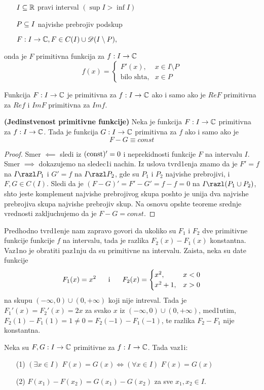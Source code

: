 \documentclass[../main_og.tex]{subfiles}
\begin{document}
\begin{itemize}
        \item[\cdot] $I\subseteq \mathbb{R}$ pravi interval $(\sup I > \inf I)$
        \item[\cdot] $P\subseteq I$ najvishe prebrojiv podskup
        \item[\cdot] $F:I\to \mathbb{C} , F\in C(I) \cup \mathscr{D}(I\setminus P),$
\end{itemize}
onda je $F$ primitivna funkcija za $f:I\to \mathbb{C}$
$$f(x)=\begin{cases}
			F'(x), & x\in I\setminus P\\
            \textrm{bilo shta}, & x\in P
		 \end{cases}$$
\begin{tvr}
Funkcija $F:I\to \mathbb{C}$ je primitivna za $f:I \to \mathbb{C}$ ako i samo ako je $Re F$ primitivna za $Re f$ i $Im F$ primitivna za $Im f$.
\end{tvr}
\begin{tvr}
\textbf{(Jedinstvenost primitivne funkcije)} Neka je funkcija $F:I \to \mathbb{C}$ primitivna za $f:I \to \mathbb{C}$. Tada je funkcija $G: I\to \mathbb{C}$ primitivna za $f$ ako i samo ako je 
$$F-G\equiv const$$
\end{tvr}
\begin{proof}
Smer $\impliedby$ sledi iz $(\textrm{\latin{const}})'=0$ i neprekidnosti funkcije $F$ na intervalu $I$. Smer $\implies$ dokazujemo na sledec1i nachin. Iz uslova tvrd1enja znamo da je $F'=f$ na $I\razl P_1$ i $G'=f$ na $I\razl P_2$, gde su $P_1$ i $P_2$ najvishe prebrojivi, i $F, G \in C(I)$. Sledi da je $(F-G)'=F'-G'=f-f=0$ na $I\razl (P_1 \cup P_2)$, shto jeste komplement najvishe prebrojivog skupa poshto je unija dva najvishe prebrojiva skupa najvishe prebrojiv skup. Na osnovu opshte teoreme srednje vrednosti zakljuchujemo da je $F-G= const$.
\end{proof}
\nap Predhodno tvrd1enje nam zapravo govori da ukoliko su $F_1$ i $F_2$ dve primitivne funkcije funkcije $f$ na intervalu, tada je razlika $F_2(x)-F_1(x)$ konstantna. Vaz1no je obratiti paz1nju da su primitivne na intervalu. Zaista, neka su date funkcije 
$$ F_1(x)=x^2 \hspace{0.6cm} \text{i} \hspace{0.6cm} F_2(x)= \begin{cases}
			x^2, & x<0\\
            x^2+1, & x>0
		 \end{cases}$$
na skupu $(-\infty,0) \cup (0,+\infty)$ koji nije intreval. Tada je $F_1'(x)=F_2'(x)=2x$ za svako $x$ iz $(-\infty,0) \cup (0,+\infty)$, med1utim, $F_2(1)-F_1(1)=1\ne 0 = F_2(-1)-F_1(-1)$, te razlika $F_2-F_1$ nije konstantna.
\begin{posl}
Neka su $F, G:I \to \mathbb{C}$ primitivne za $f:I\to \mathbb{C}$. Tada vaz1i:
  \begin{itemize}
        \item[(1)] $(\exists x \in I)$  $F(x)=G(x) \iff (\forall x \in I)$  $F(x)=G(x)$
        \item[(2)] $F(x_1)-F(x_2) = G(x_1)-G(x_2)$ za sve $x_1, x_2 \in I$.
  \end{itemize} 
\end{posl}
\end{document}
